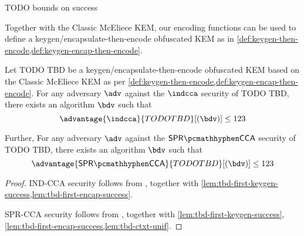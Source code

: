 \begin{lemma}[[First-encap success probability of TODO TBD] \label{lem:tbd-first-encap-success}
    TODO bounds on success
\end{lemma}

Together with the Classic McEliece KEM, our encoding functions can be used to define a keygen/encapsulate-then-encode obfuscated KEM as in \cref{def:keygen-then-encode,def:keygen-encap-then-encode}.

\begin{theorem}
    Let TODO TBD be a keygen/encapsulate-then-encode obfuscated KEM based on the Classic McEliece KEM as per \cref{def:keygen-then-encode,def:keygen-encap-then-encode}. For any adversary $\adv$ against the $\indcca$ security of TODO TBD, there exists an algorithm $\bdv$ such that
    \[ \advantage{\indcca}{TODO TBD}[(\bdv)] \leq 123 \]

    Further,  For any adversary $\adv$ against the $\sprcca$ security of TODO TBD, there exists an algorithm $\bdv$ such that
    \[ \advantage{\sprcca}{TODO TBD}[(\bdv)] \leq 123 \]
\end{theorem}
\begin{proof}
    IND-CCA security follows from \cite[Theorem~2.12]{CCS:GunSteVei24}, together with \cref{lem:tbd-first-keygen-success,lem:tbd-first-encap-success}.
    
    SPR-CCA security follows from \cite[Theorem~2.13]{CCS:GunSteVei24}, together with \cref{lem:tbd-first-keygen-success}, \ref{lem:tbd-first-encap-success,lem:tbd-ctxt-unif}.
\end{proof}